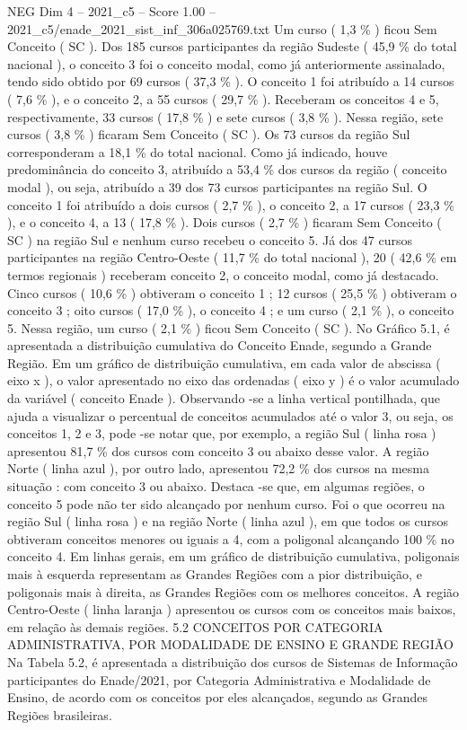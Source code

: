 \begin{textsample}{NEG Dim 4 – 2021\_c5 – Score 1.00 – 2021\_c5/enade\_2021\_sist\_inf\_306a025769.txt}
Um curso ( 1,3 \% ) ficou Sem Conceito ( SC ).
Dos 185 cursos participantes da região Sudeste ( 45,9 \% do total nacional ), o conceito 3 foi o conceito modal, como já anteriormente assinalado, tendo sido obtido por 69 cursos ( 37,3 \% ).
O conceito 1 foi atribuído a 14 cursos ( 7,6 \% ), e o conceito 2, a 55 cursos ( 29,7 \% ).
Receberam os conceitos 4 e 5, respectivamente, 33 cursos ( 17,8 \% ) e sete cursos ( 3,8 \% ).
Nessa região, sete cursos ( 3,8 \% ) ficaram Sem Conceito ( SC ).
Os 73 cursos da região Sul corresponderam a 18,1 \% do total nacional.
Como já indicado, houve predominância do conceito 3, atribuído a 53,4 \% dos cursos da região ( conceito modal ), ou seja, atribuído a 39 dos 73 cursos participantes na região Sul.
O conceito 1 foi atribuído a dois cursos ( 2,7 \% ), o conceito 2, a 17 cursos ( 23,3 \% ), e o conceito 4, a 13 ( 17,8 \% ).
Dois cursos ( 2,7 \% ) ficaram Sem Conceito ( SC ) na região Sul e nenhum curso recebeu o conceito 5.
Já dos 47 cursos participantes na região Centro-Oeste ( 11,7 \% do total nacional ), 20 ( 42,6 \% em termos regionais ) receberam conceito 2, o conceito modal, como já destacado.
Cinco cursos ( 10,6 \% ) obtiveram o conceito 1 ; 12 cursos ( 25,5 \% ) obtiveram o conceito 3 ; oito cursos ( 17,0 \% ), o conceito 4 ; e um curso ( 2,1 \% ), o conceito 5.
Nessa região, um curso ( 2,1 \% ) ficou Sem Conceito ( SC ).
No Gráfico 5.1, é apresentada a distribuição cumulativa do Conceito Enade, segundo a Grande Região.
Em um gráfico de distribuição cumulativa, em cada valor de abscissa ( eixo x ), o valor apresentado no eixo das ordenadas ( eixo y ) é o valor acumulado da variável ( conceito Enade ).
Observando -se a linha vertical pontilhada, que ajuda a visualizar o percentual de conceitos acumulados até o valor 3, ou seja, os conceitos 1, 2 e 3, pode -se notar que, por exemplo, a região Sul ( linha rosa ) apresentou 81,7 \% dos cursos com conceito 3 ou abaixo desse valor.
A região Norte ( linha azul ), por outro lado, apresentou 72,2 \% dos cursos na mesma situação : com conceito 3 ou abaixo.
Destaca -se que, em algumas regiões, o conceito 5 pode não ter sido alcançado por nenhum curso.
Foi o que ocorreu na região Sul ( linha rosa ) e na região Norte ( linha azul ), em que todos os cursos obtiveram conceitos menores ou iguais a 4, com a poligonal alcançando 100 \% no conceito 4.
Em linhas gerais, em um gráfico de distribuição cumulativa, poligonais mais à esquerda representam as Grandes Regiões com a pior distribuição, e poligonais mais à direita, as Grandes Regiões com os melhores conceitos.
A região Centro-Oeste ( linha laranja ) apresentou os cursos com os conceitos mais baixos, em relação às demais regiões. 5.2 CONCEITOS POR CATEGORIA ADMINISTRATIVA, POR MODALIDADE DE ENSINO E GRANDE REGIÃO Na Tabela 5.2, é apresentada a distribuição dos cursos de Sistemas de Informação participantes do Enade/2021, por Categoria Administrativa e Modalidade de Ensino, de acordo com os conceitos por eles alcançados, segundo as Grandes Regiões brasileiras.

\end{textsample}

